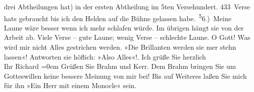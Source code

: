 \begin{ledgroupsized}[t]{13cm}
               drei Abtheilungen hat) in der ersten Abtheilung im 5ten Versehundert. 433 Verse hats gebraucht bis ich den Helden
               auf die Bühne gelassen habe. \substVorne{}\textsuperscript{5}\substDazwischen{}6\substHinten{}.) Meine Laune wäre besser {\pb}wenn ich mehr schlafen würde. Im übrigen hängt sie von der Arbeit ab. Viele Verse –
               gute Laune; wenig Verse – schlechte Laune. O Gott! Was wird mir nicht Alles
               gestrichen werden. »Die Brillanten werden sie mer stehn lassen«! Antworten sie
               höflich: »Also Alles«!.\pend
           \pstart
            Ich grüße Sie herzlich{\\[\baselineskip]}Ihr \spacefill\mbox{Richard}\pend
           \leftskip=0em{}\pstart
           \noindent{}Grüßen Sie Brahm und Kerr. Dem Brahm bringen Sie um Gotteswillen keine bessere
                  Meinung von mir bei! Bis auf Weiteres laßen Sie mich für ihn »Ein Herr mit einem
                  Monocle« sein.\pend
                     \endnumbering{}\end{ledgroupsized}  \newcommand{\dateiname}{L00988}\newcommand{\titel}{Richard Beer-Hofmann an Arthur Schnitzler, 3. 10. 1899}\newcommand{\editorInnen}{Martin Anton Müller und Gerd-Hermann Susen}
      